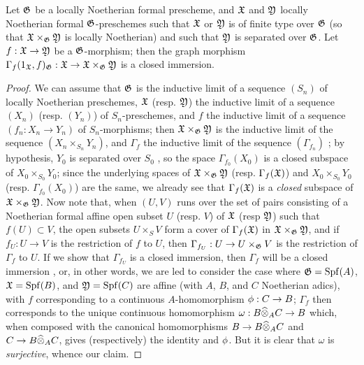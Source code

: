 \begin{prop}[10.15.4]
\label{1.10.15.4}
Let $\mathfrak{G}$ be a locally Noetherian formal prescheme, and $\mathfrak{X}$ and $\mathfrak{Y}$ locally Noetherian formal $\mathfrak{G}$-preschemes such that $\mathfrak{X}$ or $\mathfrak{Y}$ is of finite type over $\mathfrak{G}$ (so that $\mathfrak{X}\times_\mathfrak{G}\mathfrak{Y}$ is locally Noetherian) and such that $\mathfrak{Y}$ is separated over $\mathfrak{G}$.
Let $f:\fk{X}\to\fk{Y}$ be a $\mathfrak{G}$-morphism;
then the graph morphism $\Gamma_f(1_\fk{X},f)_\fk{G}:\fk{X}\to\fk{X}\times_\fk{G}\fk{Y}$ is a closed immersion.
\end{prop}

\begin{proof}
\label{proof-1.10.15.4}
We can assume that $\mathfrak{G}$ is the inductive limit of a sequence $(S_n)$ of locally Noetherian preschemes, $\mathfrak{X}$ (resp. $\mathfrak{Y}$) the inductive limit of a sequence $(X_n)$ (resp. $(Y_n)$) of $S_n$-preschemes, and $f$ the inductive limit of a sequence $(f_n:X_n\to Y_n)$ of $S_n$-morphisms;
then $\mathfrak{X}\times_\mathfrak{G}\mathfrak{Y}$ is the inductive limit of the sequence $(X_n\times_{S_n}Y_n)$, and $\Gamma_f$ the inductive limit of the sequence $(\Gamma_{f_n})$ ;
by hypothesis, $Y_0$ is separated over $S_0$ , so the space $\Gamma_{f_0}(X_0)$ is a closed subspace of $X_0\times_{S_0}Y_0$;
since the underlying spaces of $\mathfrak{X}\times_\mathfrak{G}\mathfrak{Y}$ (resp. $\Gamma_f(\mathfrak{X})$) and $X_0\times_{S_0}Y_0$ (resp. $\Gamma_{f_0}(X_0)$) are the same, we already see that $\Gamma_f(\mathfrak{X})$ is a \emph{closed} subspace of $\mathfrak{X}\times_\mathfrak{G}\mathfrak{Y}$.
Now note that, when $(U,V)$ runs over the set of pairs consisting of a Noetherian formal affine open subset $U$ (resp. $V$) of $\mathfrak{X}$ (resp $\mathfrak{Y}$) such that $f(U)\subset V$, the open subsets $U\times_S V$ form a cover of $\Gamma_f(\mathfrak{X})$ in $\mathfrak{X}\times_\mathfrak{G}\mathfrak{Y}$, and if $f_U:U\to V$ is the restriction of $f$ to $U$, then $\Gamma_{f_U}:U\to U\times_\fk{G}V$ is the restriction of $\Gamma_f$ to $U$.
If we show that $\Gamma_{f_U}$ is a closed immersion, then $\Gamma_f$ will be a closed immersion , or, in other words, we are led to consider the case where $\mathfrak{G}={\mathop{\mathrm{Spf}}\nolimits}(A)$, $\mathfrak{X}={\mathop{\mathrm{Spf}}\nolimits}(B)$, and $\mathfrak{Y}={\mathop{\mathrm{Spf}}\nolimits}(C)$ are affine (with $A$, $B$, and $C$ Noetherian adics), with $f$ corresponding to a continuous $A$-homomorphism $\vphi:C\to B$;
$\Gamma_f$ then corresponds to the unique continuous homomorphism $\omega: B\wh{\otimes}_A C\to B$ which, when composed with the canonical homomorphisms $B\to B\wh{\otimes}_A C$ and $C\to B\wh{\otimes}_A C$, gives (respectively) the identity and $\phi$.
But it is clear that $\omega$ is \emph{surjective}, whence our claim.
\end{proof}


